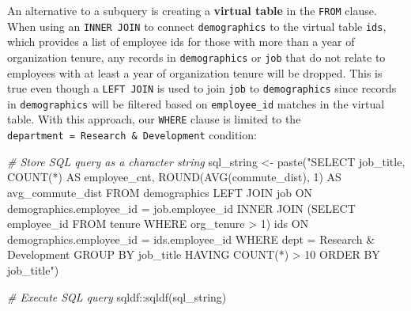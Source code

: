 \documentclass[
]{book}
\newenvironment{Shaded}{\begin{snugshade}}{\end{snugshade}}
\newcommand{\CommentTok}[1]{\textcolor[rgb]{0.56,0.35,0.01}{\textit{#1}}}
\newcommand{\FunctionTok}[1]{\textcolor[rgb]{0.00,0.00,0.00}{#1}}
\newcommand{\NormalTok}[1]{#1}
\newcommand{\OtherTok}[1]{\textcolor[rgb]{0.56,0.35,0.01}{#1}}
\newcommand{\SpecialCharTok}[1]{\textcolor[rgb]{0.00,0.00,0.00}{#1}}
\newcommand{\StringTok}[1]{\textcolor[rgb]{0.31,0.60,0.02}{#1}}
\begin{document}
An alternative to a subquery is creating a \textbf{virtual table} in the \texttt{FROM} clause. When using an \texttt{INNER\ JOIN} to connect \texttt{demographics} to the virtual table \texttt{ids}, which provides a list of employee ids for those with more than a year of organization tenure, any records in \texttt{demographics} or \texttt{job} that do not relate to employees with at least a year of organization tenure will be dropped. This is true even though a \texttt{LEFT\ JOIN} is used to join \texttt{job} to \texttt{demographics} since records in \texttt{demographics} will be filtered based on \texttt{employee\_id} matches in the virtual table. With this approach, our \texttt{WHERE} clause is limited to the \texttt{department\ =\ \textquotesingle{}Research\ \&\ Development\textquotesingle{}} condition:

\begin{Shaded}
\begin{Highlighting}[]
\CommentTok{\# Store SQL query as a character string}
\NormalTok{sql\_string }\OtherTok{\textless{}{-}} \FunctionTok{paste}\NormalTok{(}\StringTok{"SELECT}
\StringTok{                      job\_title,}
\StringTok{                      COUNT(*) AS employee\_cnt,}
\StringTok{                      ROUND(AVG(commute\_dist), 1) AS avg\_commute\_dist}
\StringTok{                    FROM}
\StringTok{                        demographics}
\StringTok{                      LEFT JOIN}
\StringTok{                        job}
\StringTok{                      ON}
\StringTok{                        demographics.employee\_id = job.employee\_id}
\StringTok{                      INNER JOIN}
\StringTok{                        (SELECT employee\_id FROM tenure WHERE org\_tenure \textgreater{} 1) ids}
\StringTok{                      ON}
\StringTok{                        demographics.employee\_id = ids.employee\_id}
\StringTok{                    WHERE}
\StringTok{                      dept = \textquotesingle{}Research \& Development\textquotesingle{}}
\StringTok{                    GROUP BY}
\StringTok{                      job\_title}
\StringTok{                    HAVING}
\StringTok{                      COUNT(*) \textgreater{} 10}
\StringTok{                    ORDER BY}
\StringTok{                      job\_title"}\NormalTok{)}

\CommentTok{\# Execute SQL query}
\NormalTok{sqldf}\SpecialCharTok{::}\FunctionTok{sqldf}\NormalTok{(sql\_string)}
\end{Highlighting}
\end{Shaded}
\end{document}
